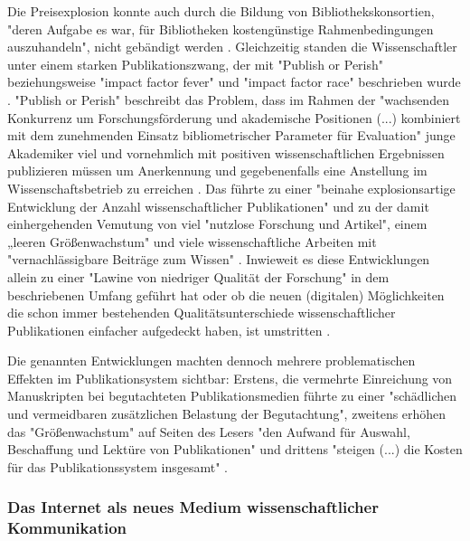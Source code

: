 Die Preisexplosion konnte auch durch die Bildung von Bibliothekskonsortien, "deren Aufgabe es war, für Bibliotheken kostengünstige Rahmenbedingungen auszuhandeln", nicht gebändigt werden \cite{Fladung_2003} \cite{Brintzinger_2010}. Gleichzeitig standen die Wissenschaftler unter einem starken Publikationszwang, der mit "Publish or Perish" \cite{CLAPHAM_2005} beziehungsweise "impact factor fever" \cite{Cherubini_2008} und "impact factor race" \cite{Brischoux_2009} beschrieben wurde \cite{offhaus_2012_institutionelle_repos}. "Publish or Perish" beschreibt das Problem, dass im Rahmen der "wachsenden Konkurrenz um Forschungsförderung und akademische Positionen (...) kombiniert mit dem zunehmenden Einsatz bibliometrischer Parameter für Evaluation" \cite{Fanelli_2010} junge Akademiker viel und vornehmlich mit positiven wissenschaftlichen Ergebnissen publizieren müssen um Anerkennung und gegebenenfalls eine Anstellung im Wissenschaftsbetrieb zu erreichen \cite{pscheida_2010_wikipedia} \cite{Beasley_2005} \cite{hamilton_1990_publishing}. Das führte zu einer "beinahe explosionsartige Entwicklung der Anzahl wissenschaftlicher Publikationen" \cite{bortz_Doering_2006_fragestellung} und zu der damit einhergehenden Vemutung von viel "nutzlose Forschung und Artikel"\cite{smith1990killing}, einem „leeren Größenwachstum" \cite{bbaw_publizieren_2015} und viele wissenschaftliche Arbeiten mit "vernachlässigbare Beiträge zum Wissen" \cite{hamilton_1990_publishing}. Inwieweit es diese Entwicklungen allein zu einer "Lawine von niedriger Qualität der Forschung" \cite{Bauerlein_2010} in dem beschriebenen Umfang geführt hat oder ob die neuen (digitalen) Möglichkeiten die schon immer bestehenden Qualitätsunterschiede wissenschaftlicher Publikationen einfacher aufgedeckt haben, ist umstritten \cite{rekdal_2014_academic}.

Die genannten Entwicklungen machten dennoch mehrere problematischen Effekten im Publikationsystem sichtbar: Erstens, die vermehrte Einreichung von Manuskripten bei begutachteten Publikationsmedien führte zu einer "schädlichen und vermeidbaren zusätzlichen Belastung der Begutachtung", zweitens erhöhen das "Größenwachstum" auf Seiten des Lesers "den Aufwand für Auswahl, Beschaffung und Lektüre von Publikationen" und drittens "steigen (...) die Kosten für das Publikationssystem insgesamt" \cite{bbaw_publizieren_2015}.

\subsubsection{Das Internet als neues Medium wissenschaftlicher Kommunikation}

